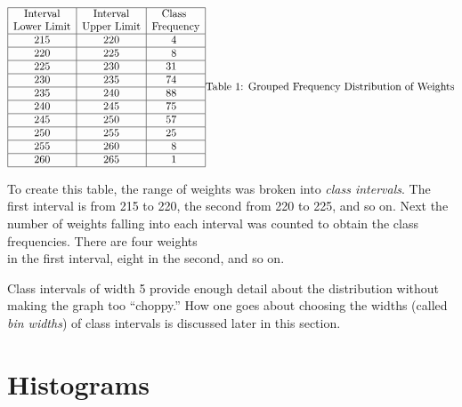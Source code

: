 \documentclass[
]{book}
\begin{document}
\[
\begin{array}{|c|c|r|} \hline
\mathrm{Interval} & \mathrm{Interval} & \mathrm{Class}\hspace{.175in}\\
\text{Lower Limit} & \text{Upper Limit} & \mathrm{Frequency} \\ \hline
215 & 220 & 4\hspace{.3in} \\  \hline
220 & 225  & 8\hspace{.3in} \\  \hline
225 & 230 & 31\hspace{.3in} \\  \hline
230 & 235 & 74\hspace{.3in} \\  \hline
235 & 240 & 88\hspace{.3in} \\  \hline
240 & 245 & 75\hspace{.3in} \\  \hline
245 & 250 & 57\hspace{.3in} \\  \hline
250 & 255 & 25\hspace{.3in} \\  \hline
255 & 260 & 8\hspace{.3in} \\  \hline
260 & 265 & 1\hspace{.3in} \\  \hline
\end{array}\\
\mbox{Table 1: Grouped Frequency Distribution of Weights}
\]

To create this table, the range of weights was broken into \emph{class intervals}.
The first interval is from 215 to 220, the second from 220 to 225, and so on.
Next the number of weights
falling into each interval was counted to obtain the class frequencies. There are four weights\\
in the first interval, eight in the second, and so on.

Class intervals of width 5 provide enough detail about the distribution without
making the graph too ``choppy.'' How one goes about choosing the widths (called \emph{bin widths}) of
class intervals is discussed later in this section.

\hypertarget{histograms}{%
\section{Histograms}\label{histograms}}
\end{document}
